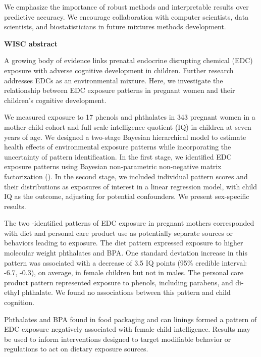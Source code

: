 We emphasize the importance of robust methods and interpretable results over predictive accuracy. We encourage collaboration with computer scientists, data scientists, and biostatisticians in future mixtures methods development.

\textbf{WISC abstract}

A growing body of evidence links prenatal endocrine disrupting chemical (EDC) exposure with adverse cognitive development in children. Further research addresses EDCs as an environmental mixture. Here, we investigate the relationship between EDC exposure patterns in pregnant women and their children's cognitive development.

We measured exposure to 17 phenols and phthalates in 343 pregnant women in a mother-child cohort and full scale intelligence quotient (IQ) in children at seven years of age. We designed a two-stage Bayesian hierarchical model to estimate health effects of environmental exposure patterns while incorporating the uncertainty of pattern identification. In the first stage, we identified EDC exposure patterns using Bayesian non-parametric non-negative matrix factorization (\bnmfc). In the second stage, we included individual pattern scores and their distributions as exposures of interest in a linear regression model, with child IQ as the outcome, adjusting for potential confounders. We present sex-specific results.

The two \bnmfc-identified patterns of EDC exposure in pregnant mothers corresponded with diet and personal care product use as potentially separate sources or behaviors leading to exposure. The diet pattern expressed exposure to higher molecular weight phthalates and BPA. One standard deviation increase in this pattern was associated with a decrease of 3.5 IQ points (95\% credible interval: -6.7, -0.3), on average, in female children but not in males. The personal care product pattern represented exposure to phenols, including parabens, and di-ethyl phthalate. We found no associations between this pattern and child cognition.

Phthalates and BPA found in food packaging and can linings formed a pattern of EDC exposure negatively associated with female child intelligence. Results may be used to inform interventions designed to target modifiable behavior or regulations to act on dietary exposure sources.

\thispagestyle{empty} 
\clearpage
